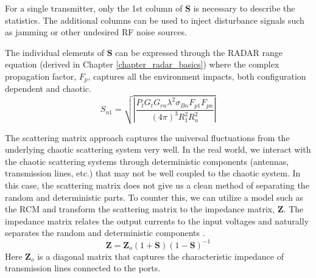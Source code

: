 For a single transmitter, only the 1st column of $\textbf{S}$ is necessary to describe the statistics. The additional columns can be used to inject disturbance signals such as jamming or other undesired RF noise sources. 

The individual elements of $\textbf{S}$ can be expressed through the RADAR range equation (derived in Chapter \ref{chapter_radar_basics}) where the complex propagation factor, $F_p$, captures all the environment impacts, both configuration dependent and chaotic.
\begin{equation}
S_{n1} = \sqrt{\left|\frac{P_tG_tG_{rn}\lambda^2\sigma_{Bn}F_{p1}F_{pn}}{(4\pi)^3R_1^2R_n^2} \right|}
\label{rmt_eq:2}
\end{equation}
\renewcommand{\baselinestretch}{2} \small\normalsize

The scattering matrix approach captures the universal fluctuations from the underlying chaotic scattering system very well. In the real world, we interact with the chaotic scattering systems through deterministic components (antennas, transmission lines, etc.) that may not be well coupled to the chaotic system. In this case, the scattering matrix does not give us a clean method of separating the random and deterministic parts. To counter this, we can utilize a model such as the RCM and transform the scattering matrix to the impedance matrix, $\textbf{Z}$. The impedance matrix relates the output currents to the input voltages \cite{yeh_first_principles} and naturally separates the random and deterministic components \cite{zheng_single}. 
\begin{equation}
\textbf{Z} = \textbf{Z}_o(1+\textbf{S})(1-\textbf{S})^{-1}
\label{rmt_eq:3}
\end{equation}
\renewcommand{\baselinestretch}{2} \small\normalsize
Here $\textbf{Z}_o$ is a diagonal matrix that captures the characteristic impedance of transmission lines connected to the ports.